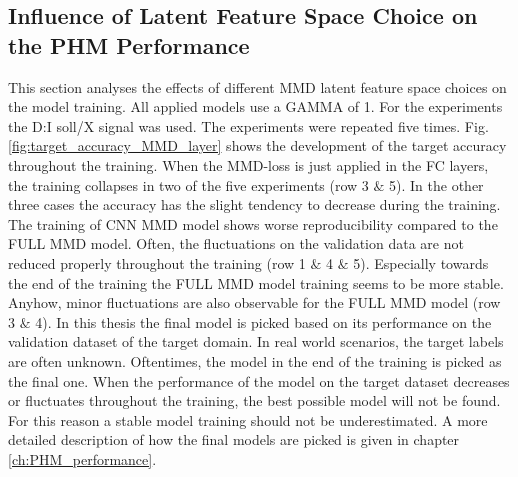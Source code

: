 \subsection{Influence of Latent Feature Space Choice on the PHM Performance}\label{ch:Influence_Layer_real_dataset}
This section analyses the effects of different MMD latent feature space choices on the model training. All applied models use a GAMMA of 1. For the experiments the D:I soll/X signal was used. The experiments were repeated five times. Fig. \ref{fig:target_accuracy_MMD_layer} shows the development of the target accuracy throughout the training. When the MMD-loss is just applied in the FC layers, the training collapses in two of the five experiments (row 3 $\&$ 5). In the other three cases the accuracy has the slight tendency to decrease during the training. The training of CNN MMD model shows worse reproducibility compared to the FULL MMD model. Often, the fluctuations on the validation data are not reduced properly throughout the training (row 1 $\&$ 4 $\&$ 5). Especially towards the end of the training the FULL MMD model training seems to be more stable. Anyhow, minor fluctuations are also observable for the FULL MMD model (row 3 $\&$ 4). In this thesis the final model is picked based on its performance on the validation dataset of the target domain. In real world scenarios, the target labels are often unknown. Oftentimes, the model in the end of the training is picked as the final one. When the performance of the model on the target dataset decreases or fluctuates throughout the training, the best possible model will not be found. For this reason a stable model training should not be underestimated. A more detailed description of how the final models are picked is given in chapter \ref{ch:PHM_performance}. 

